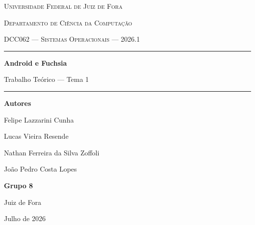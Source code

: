 \documentclass[12pt,a4paper]{article}
\begin{document}

\begin{titlepage}
  \centering
  \vspace*{1cm}

  {\scshape\large Universidade Federal de Juiz de Fora\par}
  {\scshape Departamento de Ciência da Computação\par}
  \vspace{0.4cm}
  {\scshape DCC062 --- Sistemas Operacionais --- 2026.1\par}

  \vfill

  {\color{linkazul}\rule{\linewidth}{0.6pt}}
  \vspace{0.6cm}

  {\Huge\bfseries Android e Fuchsia\par}
  \vspace{0.5cm}
  {\Large Trabalho Teórico --- Tema 1\par}
  \vspace{0.3cm}

  \vspace{0.4cm}
  {\color{linkazul}\rule{\linewidth}{0.6pt}}

  \vfill

  \begin{flushright}
    {\large\bfseries Autores\par}
    {\large Felipe Lazzarini Cunha\par}
    {\large Lucas Vieira Resende\par}
    {\large Nathan Ferreira da Silva Zoffoli\par}
    {\large João Pedro Costa Lopes\par}
    \vspace{0.6cm}
    {\large\bfseries Grupo 8\par}
  \end{flushright}

  \vfill
  {\large Juiz de Fora\par Julho de 2026\par}
\end{titlepage}

\tableofcontents
\thispagestyle{fancy}
\newpage
\end{document}
